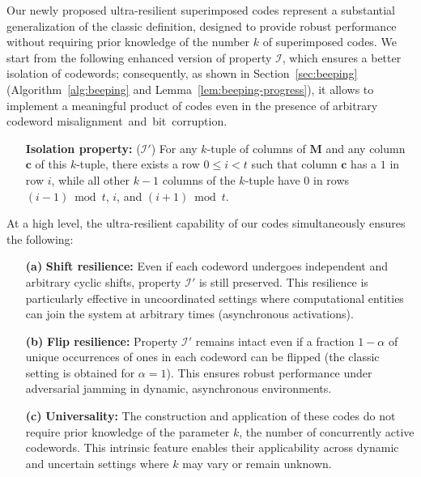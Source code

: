 \documentclass[11pt]{article}
\begin{document}
Our newly proposed ultra-resilient superimposed codes represent a substantial generalization of the classic definition, designed to provide robust performance without requiring prior knowledge of the number $k$ of superimposed codes.
We start from the following enhanced version of property ${\mathcal I}$,
which ensures a better isolation of codewords; consequently, as shown in Section~\ref{sec:beeping} (Algorithm~\ref{alg:beeping} and Lemma~\ref{lem:beeping-progress}), it allows to implement a meaningful product of codes even in the presence of arbitrary
codeword misalignment~and~bit~corruption.
\vspace*{-1ex}
\begin{itemize}[leftmargin=5.5mm]
    \item[] \textbf{Isolation property:} (${\mathcal I'}$) For any $k$-tuple of columns of $\mathbf{M}$ and any column $\mathbf{c}$ 
    of this $k$-tuple, there exists a row $0 \le i < t$ such that column $\mathbf{c}$ has a $1$ in row $i$, 
    while all other $k-1$ columns of the $k$-tuple have $0$ in rows 
    $(i-1)\bmod t$, $i$, and $(i+1)\bmod t$.
\end{itemize}

\vspace*{-1ex}
\noindent
At a high level, the ultra-resilient capability of our codes simultaneously ensures the 
following:

\vspace*{-1ex}
\begin{itemize} 
    \item[\textbf{(a)}] \textbf{Shift resilience:} Even if each codeword undergoes independent and arbitrary cyclic shifts, property ${\mathcal I'}$ is still preserved. This resilience is particularly effective in uncoordinated settings where computational entities can join the system at arbitrary times (asynchronous activations).

\vspace*{-1ex}
    \item[\textbf{(b)}] \textbf{Flip resilience:} Property ${\mathcal I'}$ remains intact 
    even if a fraction $1-\alpha$ of unique occurrences of ones in each codeword can be flipped 
(the classic setting is obtained for $\alpha = 1$).
    This ensures robust performance under adversarial jamming in dynamic, asynchronous environments. 


\vspace*{-1ex}
    \item[\textbf{(c)}] \textbf{Universality:} The construction and application of these codes do not require prior knowledge of the parameter $k$, the number of concurrently active codewords. This intrinsic feature enables their applicability across dynamic and uncertain settings where $k$ may vary or remain unknown.
\end{itemize}
\end{document}
